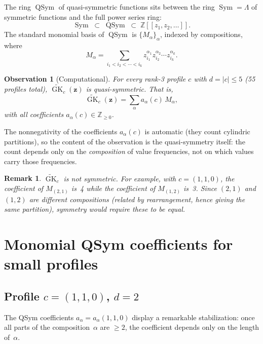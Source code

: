 \documentclass[11pt]{article}
\newtheorem{remark}[theorem]{Remark}
\newtheorem{observation}[theorem]{Observation}
\newcommand{\Z}{\mathbb{Z}}
\newcommand{\GK}{\operatorname{GK}}
\newcommand{\QSym}{\operatorname{QSym}}
\newcommand{\Sym}{\operatorname{Sym}}
\begin{document}
The ring $\QSym$ of quasi-symmetric functions sits between
the ring $\Sym = \Lambda$ of symmetric functions and the full power
series ring:
\[
  \Sym \;\subset\; \QSym \;\subset\; \Z[[z_1, z_2, \ldots]].
\]
The standard monomial basis of $\QSym$ is
$\{M_\alpha\}_{\alpha}$, indexed by compositions, where
\[
  M_\alpha
  = \sum_{i_1 < i_2 < \cdots < i_k}
    z_{i_1}^{\alpha_1} z_{i_2}^{\alpha_2} \cdots z_{i_k}^{\alpha_k}.
\]

\begin{observation}[Computational]\label{obs:qsym}
For every rank-3 profile $c$ with $d = |c| \leq 5$ (55 profiles total),
$\widetilde{\GK}_c(\mathbf{z})$ is quasi-symmetric. That is,
\begin{equation}\label{eq:qsym-expansion}
  \widetilde{\GK}_c(\mathbf{z})
  = \sum_{\alpha} a_\alpha(c)\, M_\alpha,
\end{equation}
with all coefficients $a_\alpha(c) \in \Z_{\geq 0}$.
\end{observation}

The nonnegativity of the coefficients $a_\alpha(c)$ is automatic
(they count cylindric partitions), so the content of the observation
is the quasi-symmetry itself: the count depends only on the
\emph{composition} of value frequencies, not on which values carry
those frequencies.

\begin{remark}
$\widetilde{\GK}_c$ is \emph{not} symmetric. For example,
with $c = (1,1,0)$, the coefficient of $M_{(2,1)}$ is~4
while the coefficient of $M_{(1,2)}$ is~3. Since
$(2,1)$ and $(1,2)$ are different compositions (related by
rearrangement, hence giving the same partition), symmetry
would require these to be equal.
\end{remark}

\section{Monomial QSym coefficients for small profiles}
\label{sec:data}

\subsection{Profile $c = (1,1,0)$, $d = 2$}

The QSym coefficients $a_\alpha = a_\alpha(1,1,0)$ display a
remarkable stabilization: once all parts of the composition~$\alpha$
are $\geq 2$, the coefficient depends only on the length of~$\alpha$.
\end{document}
